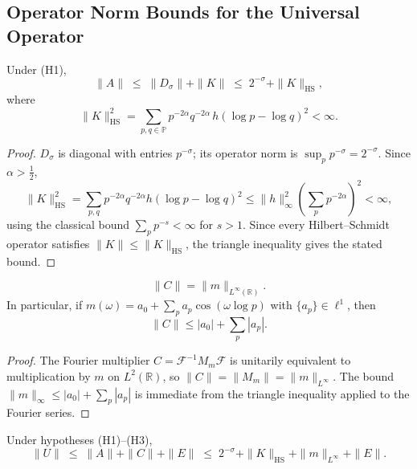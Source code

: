 \documentclass[11pt]{article}
\begin{document}
\subsection{Operator Norm Bounds for the Universal Operator}
\label{sec:normU}

\begin{proposition}
\label{prop:normA}
Under \textup{(H1)},
\[
\|A\| \;\leq\; \|D_{\sigma}\| + \|K\|
\;\leq\; 2^{-\sigma} + \|K\|_{\mathrm{HS}},
\]
where
\[
\|K\|_{\mathrm{HS}}^{2}
= \sum_{p,q\in\mathbb{P}} p^{-2\alpha}q^{-2\alpha}\,h(\log p-\log q)^{2}
< \infty.
\]
\end{proposition}

\begin{proof}
$D_{\sigma}$ is diagonal with entries $p^{-\sigma}$;
its operator norm is $\sup_{p}p^{-\sigma}=2^{-\sigma}$.
Since $\alpha>\frac{1}{2}$,
\[
\|K\|_{\mathrm{HS}}^{2}
= \sum_{p,q}p^{-2\alpha}q^{-2\alpha}h(\log p-\log q)^{2}
\leq \|h\|_{\infty}^{2}\!\!\left(\sum_{p}p^{-2\alpha}\right)^{\!2}
< \infty,
\]
using the classical bound $\sum_{p}p^{-s}<\infty$ for $s>1$.
Since every Hilbert--Schmidt operator satisfies
$\|K\|\leq\|K\|_{\mathrm{HS}}$, the triangle inequality gives
the stated bound.
\end{proof}

\begin{proposition}
\label{prop:normC}
\[
\|C\| = \|m\|_{L^{\infty}(\mathbb{R})}.
\]
In particular, if $m(\omega)=a_{0}+\sum_{p}a_{p}\cos(\omega\log p)$
with $\{a_{p}\}\in\ell^{1}$, then
\[
\|C\| \leq |a_{0}| + \sum_{p}|a_{p}|.
\]
\end{proposition}

\begin{proof}
The Fourier multiplier $C=\mathcal{F}^{-1}M_{m}\mathcal{F}$ is
unitarily equivalent to multiplication by $m$ on
$L^{2}(\mathbb{R})$, so $\|C\|=\|M_{m}\|=\|m\|_{L^{\infty}}$.
The bound $\|m\|_{\infty}\leq|a_{0}|+\sum_{p}|a_{p}|$ is
immediate from the triangle inequality applied to the
Fourier series.
\end{proof}

\begin{theorem}
\label{thm:normU}
Under hypotheses \textup{(H1)--(H3)},
\[
\|U\| \;\leq\; \|A\| + \|C\| + \|E\|
\;\leq\; 2^{-\sigma} + \|K\|_{\mathrm{HS}}
       + \|m\|_{L^{\infty}} + \|E\|.
\]
\end{theorem}
\end{document}
